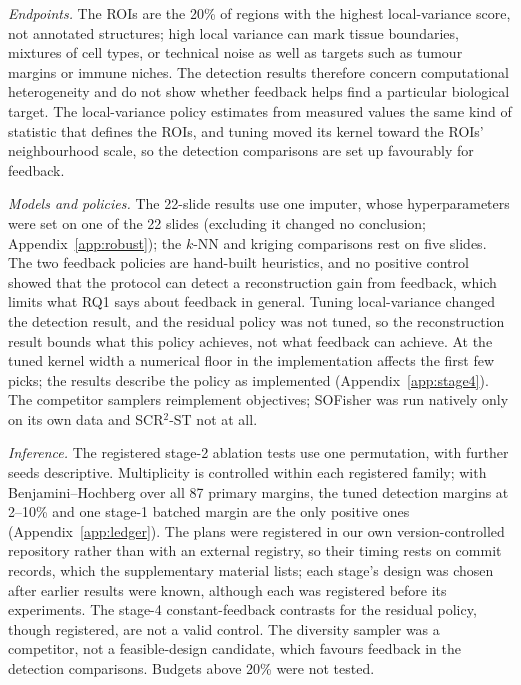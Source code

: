 \documentclass[10pt]{article}
\begin{document}
\emph{Endpoints.} The ROIs are the 20\% of regions with the highest local-variance score, not annotated
structures; high local variance can mark tissue boundaries, mixtures of cell types, or technical noise as well as
targets such as tumour margins or immune niches. The detection results therefore concern computational
heterogeneity and do not show whether feedback helps find a particular biological target. The local-variance
policy estimates from measured values the same kind of statistic that defines the ROIs, and tuning moved its kernel
toward the ROIs' neighbourhood scale, so the detection comparisons are set up favourably for feedback.

\emph{Models and policies.} The 22-slide results use one imputer, whose hyperparameters were set on one of the 22
slides (excluding it changed no conclusion; Appendix~\ref{app:robust}); the $k$-NN and kriging comparisons rest on
five slides. The two feedback policies are hand-built heuristics, and no positive control showed that the protocol can detect
a reconstruction gain from feedback, which limits what RQ1 says about feedback in general. Tuning local-variance changed the detection
result, and the residual policy was not tuned, so the reconstruction result bounds what this policy achieves, not
what feedback can achieve. At the tuned kernel width a numerical floor in the implementation affects the first few picks; the results
describe the policy as implemented (Appendix~\ref{app:stage4}).
The competitor samplers reimplement objectives; SOFisher was run natively only on its
own data and SCR$^2$-ST not at all.

\emph{Inference.} The registered stage-2 ablation tests use one permutation, with further seeds descriptive.
Multiplicity is controlled within each registered family; with Benjamini--Hochberg over all 87 primary margins,
the tuned detection margins at 2--10\% and one stage-1 batched margin are the only positive ones
(Appendix~\ref{app:ledger}). The plans were registered in our own version-controlled repository rather than with an external
registry, so their timing rests on commit records, which the supplementary material lists; each stage's design was
chosen after earlier results were known, although each was registered before its experiments. The stage-4
constant-feedback contrasts for the residual policy, though registered, are not a valid control. The diversity
sampler was a competitor, not a feasible-design candidate, which favours feedback in the detection comparisons. Budgets above 20\%
were not tested.
\end{document}
